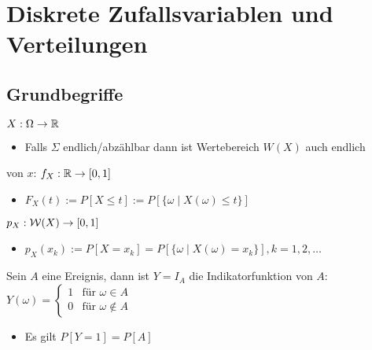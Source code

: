 
\section{Diskrete Zufallsvariablen und Verteilungen}
\subsection{Grundbegriffe}
\begin{itemize}
     $X: \Omega \to \mathbb{R}$
        \begin{itemize}
            \item Falls $\Sigma$ endlich/abzählbar dann ist Wertebereich $W(X)$ auch endlich
        \end{itemize}
     von $x$: $f_X : \mathbb{R} \to [0,1]$
        \begin{itemize}
            \item $F_X(t) := P[X \le t] := P[\{\omega \mid X(\omega) \le t\}]$
        \end{itemize}
     $p_X: \mathcal{W}(X) \to [0,1]$
        \begin{itemize}
            \item $p_X(x_k) := P[X = x_k] = P[\{\omega \mid X(\omega) = x_k\}], k = 1, 2, \dots$
        \end{itemize}
         Sein $A$ eine Ereignis, dann ist $Y = I_A$ die Indikatorfunktion von $A$: $Y(\omega)=
\begin{cases}
    1 & \text{für } \omega \in A\\
    0 & \text{für } \omega \notin A
\end{cases}$
            \begin{itemize}
                \item Es gilt $P[Y = 1] = P[A]$
            \end{itemize}
\end{itemize}

